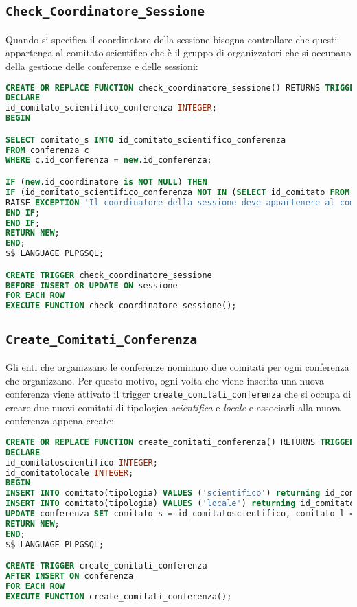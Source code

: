 \subsection{\texttt{Check\_Coordinatore\_Sessione}}
Quando si specifica il coordinatore della sessione bisogna controllare che questi appartenga al comitato scientifico che è il gruppo di organizzatori che si occupano della gestione delle conferenze e delle sessioni:
\begin{lstlisting}[caption={check\_coordinatore\_sessione}, language=sql, style=mystyle]
CREATE OR REPLACE FUNCTION check_coordinatore_sessione() RETURNS TRIGGER AS $$
DECLARE 
id_comitato_scientifico_conferenza INTEGER;
BEGIN

SELECT comitato_s INTO id_comitato_scientifico_conferenza
FROM conferenza c
WHERE c.id_conferenza = new.id_conferenza;

IF (new.id_coordinatore is NOT NULL) THEN
IF (id_comitato_scientifico_conferenza NOT IN (SELECT id_comitato FROM organizzatore_comitato WHERE id_organizzatore = new.id_coordinatore))  THEN
RAISE EXCEPTION 'Il coordinatore della sessione deve appartenere al comitato scientifico della conferenza';
END IF;
END IF;
RETURN NEW;
END;
$$ LANGUAGE PLPGSQL;

CREATE TRIGGER check_coordinatore_sessione
BEFORE INSERT OR UPDATE ON sessione
FOR EACH ROW
EXECUTE FUNCTION check_coordinatore_sessione();

\end{lstlisting}
\subsection{\texttt{Create\_Comitati\_Conferenza}}
Gli enti che organizzano le conferenze nominano due comitati per ogni conferenza che organizzano. Per questo motivo, ogni volta che viene inserita una nuova conferenza viene attivato il trigger \texttt{create\_comitati\_conferenza} che si occupa di creare due nuovi comitati di tipologica \textit{scientifica} e \textit{locale} e associarli alla nuova conferenza appena create:
\begin{lstlisting}[language=SQL, style=mystyle, caption={\texttt{create\_comitati\_conferenza}}]
CREATE OR REPLACE FUNCTION create_comitati_conferenza() RETURNS TRIGGER AS $$
DECLARE 
id_comitatoscientifico INTEGER;
id_comitatolocale INTEGER;
BEGIN
INSERT INTO comitato(tipologia) VALUES ('scientifico') returning id_comitato INTO id_comitatoscientifico;
INSERT INTO comitato(tipologia) VALUES ('locale') returning id_comitato INTO id_comitatolocale;
UPDATE conferenza SET comitato_s = id_comitatoscientifico, comitato_l = id_comitatolocale WHERE id_conferenza = new.id_conferenza;
RETURN NEW;
END;
$$ LANGUAGE PLPGSQL;

CREATE TRIGGER create_comitati_conferenza
AFTER INSERT ON conferenza
FOR EACH ROW
EXECUTE FUNCTION create_comitati_conferenza();
\end{lstlisting}
